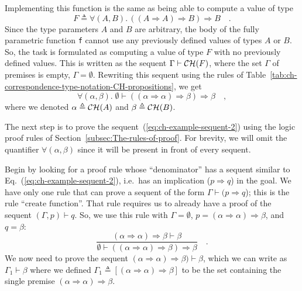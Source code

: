 \noindent Implementing this function is the same as being able to
compute a value of type 
\[
F\triangleq\forall(A,B).\,((A\Rightarrow A)\Rightarrow B)\Rightarrow B\quad.
\]
Since the type parameters $A$ and $B$ are arbitrary, the body of
the fully parametric function \lstinline!f! cannot use any previously
defined values of types $A$ or $B$. So, the task is formulated as
computing a value of type $F$ with no previously defined values.
This is written as the sequent $\Gamma\vdash{\cal CH}(F)$, where
the set $\Gamma$ of premises is empty, $\Gamma=\emptyset$. Rewriting
this sequent using the rules of Table~\ref{tab:ch-correspondence-type-notation-CH-propositions},
we get
\begin{equation}
\forall(\alpha,\beta).\;\emptyset\vdash((\alpha\Rightarrow\alpha)\Rightarrow\beta)\Rightarrow\beta\quad,\label{eq:ch-example-sequent-2}
\end{equation}
where we denoted $\alpha\triangleq{\cal CH}(A)$ and $\beta\triangleq{\cal CH}(B)$. 

The next step is to prove the sequent~(\ref{eq:ch-example-sequent-2})
using the logic proof rules of Section~\ref{subsec:The-rules-of-proof}.
For brevity, we will omit the quantifier $\forall(\alpha,\beta)$
since it will be present in front of every sequent.

Begin by looking for a proof rule whose ``denominator'' has a sequent
similar to Eq.~(\ref{eq:ch-example-sequent-2}), i.e.~has an implication
($p\Rightarrow q$) in the goal. We have only one rule that can prove
a sequent of the form $\Gamma\vdash(p\Rightarrow q$); this is the
rule ``$\text{create function}$''. That rule requires us to already
have a proof of the sequent $(\Gamma,p)\vdash q$. So, we use this
rule with $\Gamma=\emptyset$, $p=(\alpha\Rightarrow\alpha)\Rightarrow\beta$,
and $q=\beta$: 
\[
\frac{(\alpha\Rightarrow\alpha)\Rightarrow\beta\vdash\beta}{\emptyset\vdash((\alpha\Rightarrow\alpha)\Rightarrow\beta)\Rightarrow\beta}\quad.
\]
We now need to prove the sequent $(\alpha\Rightarrow\alpha)\Rightarrow\beta)\vdash\beta$,
which we can write as $\Gamma_{1}\vdash\beta$ where we defined $\Gamma_{1}\triangleq[(\alpha\Rightarrow\alpha)\Rightarrow\beta]$
to be the set containing the single premise $(\alpha\Rightarrow\alpha)\Rightarrow\beta$. 

